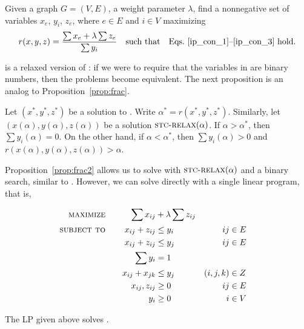 \begin{problem}[\prbstrwkr]
Given a graph $G = (V,E)$, a weight parameter $\lambda$, find a nonnegative set of variables $x_{e}$, $y_i$, $z_{e}$, where $e \in E$ and $i \in V$ maximizing
\[
    r(x, y, z) = \frac{\sum x_e + \lambda \sum z_e}{ \sum y_i}
    \quad\text{such that}\quad\text{Eqs.~\ref{ip_con_1}--\ref{ip_con_3} hold}.
\]
\end{problem}

\prbstrwkr is a relaxed version of \prbstrwk:
if we were to require that the variables in \prbstrwkr are binary numbers, then the problems become equivalent. The next proposition is an analog to Proposition~\ref{prop:frac}.

\begin{proposition}
\label{prop:frac2}
 Let $(x^*, y^*, z^*)$ be a solution to \prbstrwkr. Write $\alpha^* = r(x^*, y^*, z^*)$.
Similarly, let $(x(\alpha), y(\alpha), z(\alpha))$ be a solution $\textsc{stc-relax}(\alpha)$.
 If $\alpha > \alpha^*$, then $\sum y_i(\alpha) = 0$. On the other hand, if $\alpha < \alpha^*$, then $\sum y_i(\alpha) > 0$ and $r(x(\alpha), y(\alpha), z(\alpha)) > \alpha$.
\end{proposition}



Proposition~\ref{prop:frac2} allows us to solve \prbstrwkr with $\textsc{stc-relax}(\alpha)$ and a binary search, similar to \algip. However, we can solve \prbstrwkr directly with a single linear program, that is,


\begin{alignat*}{3}
	\textsc{maximize}&\quad& \sum x_{ij} & + \lambda  \sum z_{ij}   & 
	\\  
	\textsc{subject to} &&  x_{ij} + z_{ij} & \leq y_i &  ij & \in E \\
	&& x_{ij} + z_{ij} & \leq y_j &  ij & \in E\\
   && \sum y_i & = 1 \\
    && x_{ij}  + x_{jk} & \leq y_j & (i, j, k) & \in Z\\
        && x_{ij}, z_{ij} & \geq 0 &  ij & \in E\\
        && y_{i} & \geq 0 &  i & \in V
\end{alignat*}

\begin{proposition}
\label{prop:lp}
The LP given above solves \prbstrwkr.
\end{proposition}

